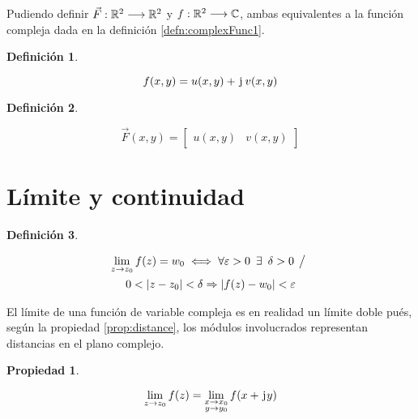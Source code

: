 \documentclass[a5paper,12pt,twoside]{book}
\newtheorem{defn}{{Definición}}[chapter]
\newtheorem{prop}{{Propiedad}}[chapter]
\begin{document}
Pudiendo definir $\Vec{F}: \mathbb{R}^2 \longrightarrow \mathbb{R}^2$ y $f: \mathbb{R}^2 \longrightarrow \mathbb{C}$, ambas equivalentes a la función compleja dada en la definición \ref{defn:complexFunc1}.

\begin{mdframed}[style=DefinitionFrame]
    \begin{defn}
    \end{defn}
    \begin{equation*}
        f(x,y) = u(x,y) + \mkern2mu\mathrm{j}\mkern1mu \, v(x,y)
    \end{equation*}
\end{mdframed}

\begin{mdframed}[style=DefinitionFrame]
    \begin{defn}
    \end{defn}
    \begin{equation*}
        \Vec{F}(x,y) = \begin{bmatrix} u(x,y) & v(x,y) \end{bmatrix}
    \end{equation*}
\end{mdframed}


\section{Límite y continuidad}

\begin{mdframed}[style=DefinitionFrame]
    \begin{defn}
    \end{defn}
    \begin{multline*}
        \lim_{z \to z_0} f(z) = w_0 \iff \forall \varepsilon > 0 \enspace \exists \enspace \delta > 0 \hspace{1ex} \big/ \hspace{1ex}
        \\
        0 < {\left| {z-z_0} \right|} < \delta \Rightarrow {\left| {f(z)-w_0} \right|} < \varepsilon
    \end{multline*}
\end{mdframed}

El límite de una función de variable compleja es en realidad un límite doble pués, según la propiedad \ref{prop:distance}, los módulos involucrados representan distancias en el plano complejo.

\begin{mdframed}[style=PropertyFrame]
    \begin{prop}
        \label{prop:limit}
    \end{prop}
    \begin{equation*}
        \lim_{z \to z_0} f(z) = \lim_{\substack{x \to x_0\\y \to y_0}} f(x + \mkern2mu\mathrm{j}\mkern1mu y)
    \end{equation*}
\end{mdframed}
\end{document}

